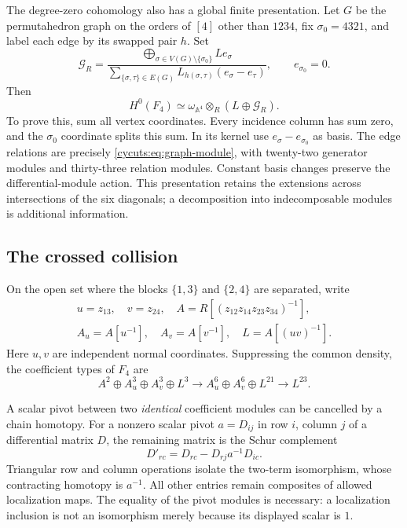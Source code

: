 The degree-zero cohomology also has a global finite presentation.
Let $G$ be the permutahedron graph on the orders of $[4]$ other than $1234$,
fix $\sigma_0=4321$, and label each edge by its swapped pair $h$.
Set
\begin{equation}\label{cycuts:eq:graph-module}
 \mathcal G_R=
 \frac{\displaystyle\bigoplus_{\sigma\in V(G)\setminus\{\sigma_0\}}L e_\sigma}
 {\displaystyle\sum_{\{\sigma,\tau\}\in E(G)}
                   L_{h(\sigma,\tau)}(e_\sigma-e_\tau)},
 \qquad e_{\sigma_0}=0.
\end{equation}
Then
\begin{equation}\label{cycuts:eq:four-zero}
 H^0(F_4)\simeq\omega_{\mathbb A^4}\otimes_R(L\oplus\mathcal G_R).
\end{equation}
To prove this, sum all vertex coordinates. Every incidence column
has sum zero, and the $\sigma_0$ coordinate splits this sum.
In its kernel use $e_\sigma-e_{\sigma_0}$ as basis. The edge
relations are precisely \eqref{cycuts:eq:graph-module}, with twenty-two
generator modules and thirty-three relation modules. Constant basis
changes preserve the differential-module action. This presentation
retains the extensions across intersections of the six diagonals;
a decomposition into indecomposable modules is additional information.

\subsection{The crossed collision}

On the open set where the blocks $\{1,3\}$ and $\{2,4\}$ are
separated, write
\[
 \begin{gathered}
 u=z_{13},\quad v=z_{24},\quad
 A=R[(z_{12}z_{14}z_{23}z_{34})^{-1}],\\
 A_u=A[u^{-1}],\quad A_v=A[v^{-1}],\quad L=A[(uv)^{-1}].
 \end{gathered}
\]
Here $u,v$ are independent normal coordinates. Suppressing the common
density, the coefficient types of $F_4$ are
\begin{equation}\label{cycuts:eq:crossed-types}
 A^2\oplus A_u^3\oplus A_v^3\oplus L^3
 \longrightarrow A_u^6\oplus A_v^6\oplus L^{21}
 \longrightarrow L^{23}.
\end{equation}

A scalar pivot between two \emph{identical} coefficient modules
can be cancelled by a chain homotopy. For a nonzero scalar pivot
$a=D_{ij}$ in row $i$, column $j$ of a differential matrix $D$, the
remaining matrix is the Schur complement
\begin{equation}\label{cycuts:eq:schur}
 D'_{rc}=D_{rc}-D_{rj}a^{-1}D_{ic}.
\end{equation}
Triangular row and column operations isolate the two-term isomorphism,
whose contracting homotopy is $a^{-1}$. All other entries remain
composites of allowed localization maps. The equality of the pivot
modules is necessary: a localization inclusion is not an isomorphism
merely because its displayed scalar is $1$.

